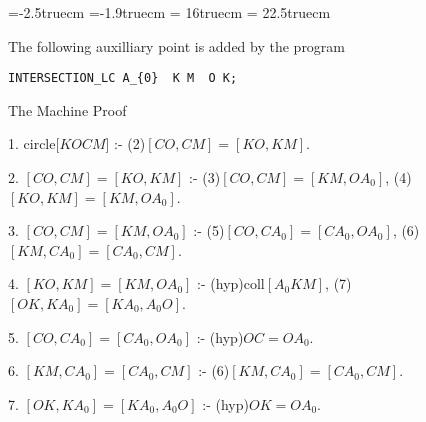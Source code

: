 \voffset=-2.5truecm
\hoffset=-1.9truecm
\textwidth = 16truecm
\textheight = 22.5truecm
\parskip=8pt
\parindent=15pt
\def\fa#1#2{\langle{#1},{#2}\rangle}

The following auxilliary point is added by the program

\begin{verbatim}
INTERSECTION_LC A_{0}  K M  O K;
\end{verbatim}


{\vskip6pt \parskip=6pt \parindent=10pt 
The Machine Proof


1. circle[$KOCM$] :- (2)$[CO,CM]=[KO,KM]$.

2. $[CO,CM]=[KO,KM]$ :- (3)$[CO,CM]=[KM,OA_{0}]$, (4)$[KO,KM]=[KM,OA_{0}]$.

3. $[CO,CM]=[KM,OA_{0}]$ :- (5)$[CO,CA_{0}]=[CA_{0},OA_{0}]$, (6)$[KM,CA_{0}]=[CA_{0},CM]$.

4. $[KO,KM]=[KM,OA_{0}]$ :- (hyp)coll$[A_{0}KM]$, (7)$[OK,KA_{0}]=[KA_{0},A_{0}O]$.

5. $[CO,CA_{0}]=[CA_{0},OA_{0}]$ :- (hyp)$OC = OA_{0}$.

6. $[KM,CA_{0}]=[CA_{0},CM]$ :- (6)$[KM,CA_{0}]=[CA_{0},CM]$.

7. $[OK,KA_{0}]=[KA_{0},A_{0}O]$ :- (hyp)$OK = OA_{0}$.
}

